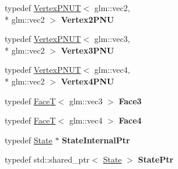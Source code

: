 \begin{DoxyCompactItemize}
\item 
\hypertarget{namespaces9_ab5a9c090c1e3fd178d6f09a83c811ff4}{typedef \hyperlink{structs9_1_1VertexPNUT}{Vertex\-P\-N\-U\-T}$<$ glm\-::vec2, \\*
glm\-::vec2 $>$ {\bfseries Vertex2\-P\-N\-U}}\label{namespaces9_ab5a9c090c1e3fd178d6f09a83c811ff4}

\item 
\hypertarget{namespaces9_a6f3356fbc3161269963998a8016353df}{typedef \hyperlink{structs9_1_1VertexPNUT}{Vertex\-P\-N\-U\-T}$<$ glm\-::vec3, \\*
glm\-::vec2 $>$ {\bfseries Vertex3\-P\-N\-U}}\label{namespaces9_a6f3356fbc3161269963998a8016353df}

\item 
\hypertarget{namespaces9_a151a22b38cb7288bbc5c61f3e8ff74b5}{typedef \hyperlink{structs9_1_1VertexPNUT}{Vertex\-P\-N\-U\-T}$<$ glm\-::vec4, \\*
glm\-::vec2 $>$ {\bfseries Vertex4\-P\-N\-U}}\label{namespaces9_a151a22b38cb7288bbc5c61f3e8ff74b5}

\item 
\hypertarget{namespaces9_a9c60e164ad51e9ec83e2859caad3a75e}{typedef \hyperlink{structs9_1_1FaceT}{Face\-T}$<$ glm\-::vec3 $>$ {\bfseries Face3}}\label{namespaces9_a9c60e164ad51e9ec83e2859caad3a75e}

\item 
\hypertarget{namespaces9_ac92f5920c4e35bc4298ed5f0874cdd3e}{typedef \hyperlink{structs9_1_1FaceT}{Face\-T}$<$ glm\-::vec4 $>$ {\bfseries Face4}}\label{namespaces9_ac92f5920c4e35bc4298ed5f0874cdd3e}

\item 
\hypertarget{namespaces9_a0fc41616c998e93ef3bf9ba690b7433f}{typedef \hyperlink{classs9_1_1State}{State} $\ast$ {\bfseries State\-Internal\-Ptr}}\label{namespaces9_a0fc41616c998e93ef3bf9ba690b7433f}

\item 
\hypertarget{namespaces9_ac9ab56b7fa41e5d9da243b098dd8d51c}{typedef std\-::shared\-\_\-ptr$<$ \hyperlink{classs9_1_1State}{State} $>$ {\bfseries State\-Ptr}}\label{namespaces9_ac9ab56b7fa41e5d9da243b098dd8d51c}

\end{DoxyCompactItemize}
